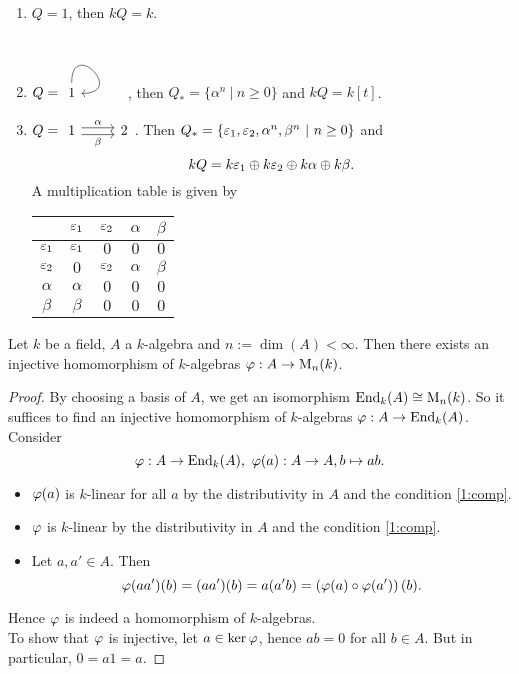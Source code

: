 \begin{bsp}\label{1:quiv}
	\begin{enumerate}
		\item $Q=1$, then $kQ=k$.
		\item $Q=\begin{tikzcd}1\arrow[out=90,in=0,loop]\end{tikzcd}$, then $Q_{\ast}=\{\alpha^n~|~n\geq 0\}$ and $kQ = k[t]$.
		\item $Q =\begin{tikzcd}1\ar[shift left]{r}{\alpha}\ar[shift right,swap]{r}{\beta}&2\end{tikzcd}$. Then
		$Q_{\ast} = \{\varepsilon_1,\varepsilon_2,\alpha^n,\beta^n~|~n\geq 0\}$ and
		\[
		kQ = k\varepsilon_1\oplus k\varepsilon_2\oplus k\alpha \oplus k\beta.
		\]
		A multiplication table is given by\\
		\begin{center}
			\begin{tabular}{|c|c|c|c|c|}
				\hline
				&$\varepsilon_1$&$\varepsilon_2$&$\alpha$&$\beta$\\ \hline
				$\varepsilon_1$&$\varepsilon_1$&$0$&$0$&$0$\\ \hline
				$\varepsilon_2$&$0$&$\varepsilon_2$&$\alpha$&$\beta$\\ \hline
				$\alpha$&$\alpha$&$0$&$0$&$0$\\ \hline
				$\beta$&$\beta$&$0$&$0$&$0$\\ \hline
			\end{tabular}
		\end{center}
	\end{enumerate}
\end{bsp}
\begin{lem}
	Let $k$ be a field, $A$ a $k$-algebra and $n:=\dim(A)<\infty$. Then there exists an injective homomorphism of $k$-algebras $\varphi:A\to \operatorname{M}_n(k)$.
\end{lem}
\begin{proof}
	By choosing a basis of $A$, we get an isomorphism $\operatorname{End}_k(A)\cong \operatorname{M}_n(k)$. So it suffices to find an injective homomorphism of $k$-algebras $\varphi:A\to \operatorname{End}_k(A)$.\\
	Consider
	\[
	\varphi:A\to \operatorname{End}_k(A),~\varphi(a):A\to A,b\mapsto ab.
	\]
	\begin{itemize}
		\item $\varphi(a)$ is $k$-linear for all $a$ by the distributivity in $A$ and the condition \eqref{1:comp}.
		\item $\varphi$ is $k$-linear by the distributivity in $A$ and the condition \eqref{1:comp}.
		\item Let $a,a'\in A$. Then
		\[
		\varphi(aa')(b)=(aa')(b)=a(a'b)=\left(\varphi(a)\circ\varphi(a')\right)(b).
		\]
	\end{itemize}
	Hence $\varphi$ is indeed a homomorphism of $k$-algebras.\\
	To show that $\varphi$ is injective, let $a\in \ker \varphi$, hence $ab=0$ for all $b\in A$. But in particular, $0=a1=a$.
	\end{proof}
\lec
